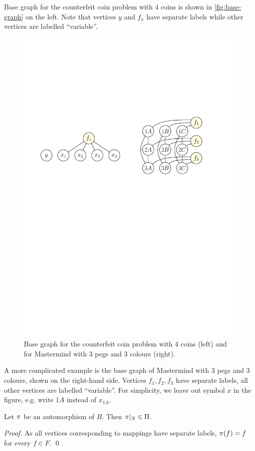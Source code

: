 \begin{example} \label{ex:cc-runbase}
Base graph for the counterfeit coin problem with 4 coins is shown in
\autoref{fig:base-graph} on the left.
Note that vertices $y$ and $f_x$ have separate labels while
  other vertices are labelled ``variable''.

\begin{figure}[h]
\begin{center}
\includegraphics[width=.6\textwidth]{pictures/base-graph.pdf}
\caption{Base graph for the counterfeit coin problem with 4 coins (left) and\\
  for Mastermind with 3 pegs and 3 colours (right).}
\label{fig:base-graph}
\end{center}
\end{figure}
\end{example}

A more complicated example is the base graph of Mastermind with 3 pegs and 3 colours,
  shown on the right-hand side.
Vertices $f_1, f_2, f_3$ have separate labels, all other vertices are labelled ``variable''.
For simplicity, we leave out symbol $x$ in the figure, e.g.
  write $1A$ instead of $x_{1A}$.\eqed

\begin{lemma}\label{lma:autobase}
Let  $\pi$ be an automorphism of $B$. Then $\pi|_X \in\Pi$.
\end{lemma}

\begin{proof}
As all vertices corresponding to mappings have separate labels, $\pi(f) = f$ for every $f\in F$.
 \qed
\end{proof}

